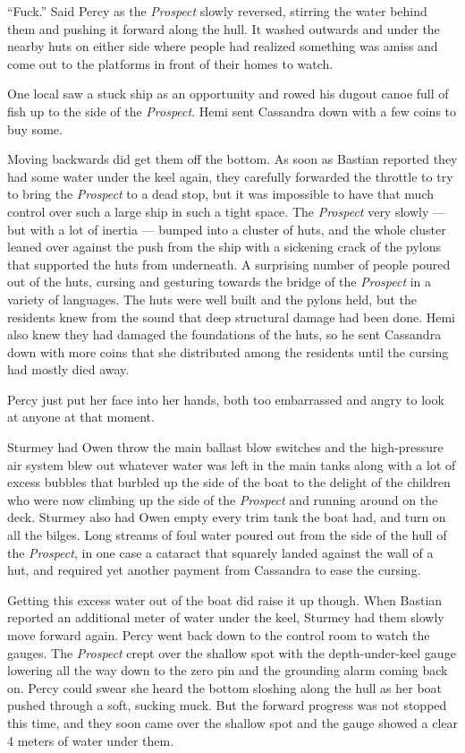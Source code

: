 \documentclass[]{scrbook}
\begin{document}
``Fuck.'' Said Percy as the \emph{Prospect} slowly reversed, stirring
the water behind them and pushing it forward along the hull. It washed
outwards and under the nearby huts on either side where people had
realized something was amiss and come out to the platforms in front of
their homes to watch.

One local saw a stuck ship as an opportunity and rowed his dugout canoe
full of fish up to the side of the \emph{Prospect}. Hemi sent Cassandra
down with a few coins to buy some.

Moving backwards did get them off the bottom. As soon as Bastian
reported they had some water under the keel again, they carefully
forwarded the throttle to try to bring the \emph{Prospect} to a dead
stop, but it was impossible to have that much control over such a large
ship in such a tight space. The \emph{Prospect} very slowly --- but with
a lot of inertia --- bumped into a cluster of huts, and the whole
cluster leaned over against the push from the ship with a sickening
crack of the pylons that supported the huts from underneath. A
surprising number of people poured out of the huts, cursing and
gesturing towards the bridge of the \emph{Prospect} in a variety of
languages. The huts were well built and the pylons held, but the
residents knew from the sound that deep structural damage had been done.
Hemi also knew they had damaged the foundations of the huts, so he sent
Cassandra down with more coins that she distributed among the residents
until the cursing had mostly died away.

Percy just put her face into her hands, both too embarrassed and angry
to look at anyone at that moment.

Sturmey had Owen throw the main ballast blow switches and the
high-pressure air system blew out whatever water was left in the main
tanks along with a lot of excess bubbles that burbled up the side of the
boat to the delight of the children who were now climbing up the side of
the \emph{Prospect} and running around on the deck. Sturmey also had
Owen empty every trim tank the boat had, and turn on all the bilges.
Long streams of foul water poured out from the side of the hull of the
\emph{Prospect}, in one case a cataract that squarely landed against the
wall of a hut, and required yet another payment from Cassandra to ease
the cursing.

Getting this excess water out of the boat did raise it up though. When
Bastian reported an additional meter of water under the keel, Sturmey
had them slowly move forward again. Percy went back down to the control
room to watch the gauges. The \emph{Prospect} crept over the shallow
spot with the depth-under-keel gauge lowering all the way down to the
zero pin and the grounding alarm coming back on. Percy could swear she
heard the bottom sloshing along the hull as her boat pushed through a
soft, sucking muck. But the forward progress was not stopped this time,
and they soon came over the shallow spot and the gauge showed a clear 4
meters of water under them.
\end{document}
